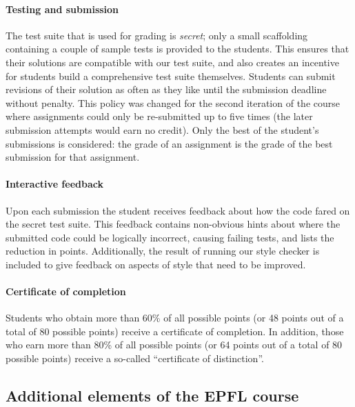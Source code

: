 \documentclass{sig-alternate}
\begin{document}
\paragraph{Testing and submission}

The test suite that is used for grading is {\em secret}; only a small
scaffolding containing a couple of sample tests is provided to the students.
This ensures that their solutions are compatible with our test suite, and
also creates an incentive for students build a comprehensive test
suite themselves. Students can submit revisions of their solution as often
as they like until the submission deadline without penalty. This policy was
changed for the second iteration of the course where assignments could only be
re-submitted up to five times (the later submission attempts would
earn no credit). Only the best of the student's submissions is considered:
the grade of an assignment is the grade of the best submission for that
assignment.

\paragraph{Interactive feedback}

Upon each submission the student receives feedback about how the code fared on
the secret test suite. This feedback contains non-obvious hints about where the submitted code could be logically incorrect, causing failing tests, and
lists the reduction in points. Additionally, the result of
running our style checker is included to give feedback on aspects of style
that need to be improved.


\paragraph{Certificate of completion} Students who obtain more than 60\% of
all possible points (or 48 points out of a total of 80 possible points) receive a certificate of completion. In addition, those
who earn more than 80\% of all possible points (or 64 points out of a total of 80 possible points) receive a so-called
``certificate of distinction''.

\subsection{Additional elements of the EPFL course}
\end{document}
